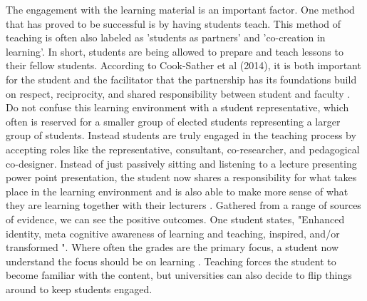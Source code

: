 \documentclass[12pt]{article}
\begin{document}
The engagement with the learning material is an important factor. One method that has proved to be successful is by having students teach. This method of teaching is often also labeled as 'students as partners' and 'co-creation in learning'. In short, students are being allowed to prepare and teach lessons to their fellow students. According to Cook-Sather et al (2014), it is both important for the student and the facilitator that the partnership has its foundations build on respect, reciprocity, and shared responsibility between student and faculty \cite{engaging-students}. Do not confuse this learning environment with a student representative, which often is reserved for a smaller group of elected students representing a larger group of students. Instead students are truly engaged in the teaching process by accepting roles like the representative, consultant, co-researcher, and pedagogical co-designer. Instead of just passively sitting and listening to a lecture presenting power point presentation, the student now shares a responsibility for what takes place in the learning environment and is also able to make more sense of what they are learning together with their lecturers \cite{cocreation-in-learning}. Gathered from a range of sources of evidence, \cite{cocreation-in-learning} we can see the positive outcomes. One student states, "Enhanced identity, meta cognitive awareness of learning and teaching, inspired, and/or transformed \cite{investigation-of-cocreation}". Where often the grades are the primary focus, a student now understand the focus should be on learning \cite{voices-in-the-study-of-teaching-and-learning}. Teaching forces the student to become familiar with the content, but universities can also decide to flip things around to keep students engaged.
\end{document}
